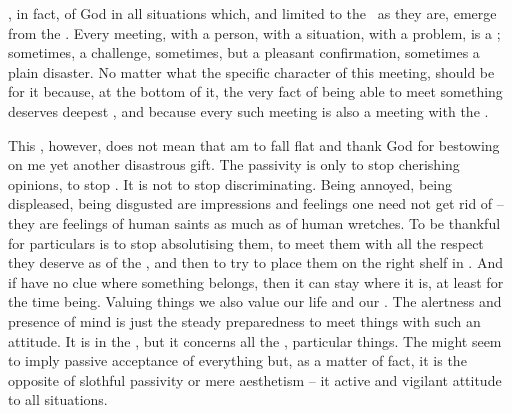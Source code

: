 
\label{pa:actpass}
 , in fact,  of God
in all situations which,  and limited to the \hoa\ as they are,
emerge from the . 
Every meeting, with a person, with a situation, with a problem, is a ;
sometimes, a challenge, sometimes, but a pleasant confirmation, sometimes a
plain disaster.  No matter what the specific character of this meeting, 
should be  for it because, at the bottom of it, the very fact of
being able to meet something deserves deepest , and because every
such  meeting is also a meeting with the .  

This , however, does not mean that  am to fall flat and
thank God for bestowing on me yet another disastrous gift.  The 
passivity is only to stop cherishing opinions, to stop 
. It is not to stop discriminating.  Being annoyed, being
displeased, being disgusted are impressions and feelings one need not get rid of
-- they are feelings of human saints as much as of human wretches.  To be
thankful for particulars is to stop absolutising them, to meet them with all
the respect they deserve as  of the , and then to try to
place them on the right shelf in .
%
And if  have no clue where something belongs, then it can stay where it
is, at least for the time being.  Valuing things we also value our life and
 our .  The alertness and presence of mind is just the
steady preparedness to meet things with such an attitude.  It is  in
the , but it concerns all the ,
particular things. The  might seem to imply passive
acceptance of everything but, as a matter of fact, it is the opposite of
slothful passivity or mere aesthetism -- it  active and vigilant
attitude to all  situations.

